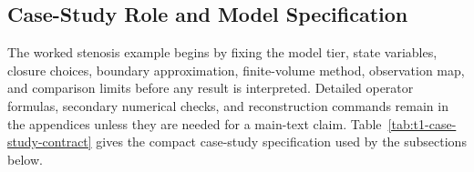 \subsection{Case-Study Role and Model Specification}
\label{sec:methodology}

The worked stenosis example begins by fixing the model tier, state variables,
closure choices, boundary approximation, finite-volume method, observation map,
and comparison limits before any result is interpreted. Detailed operator
formulas, secondary numerical checks, and reconstruction commands remain in the
appendices unless they are needed for a main-text claim.
Table~\ref{tab:t1-case-study-contract} gives the compact case-study
specification used by the subsections below.

\begin{center}
\end{center}

